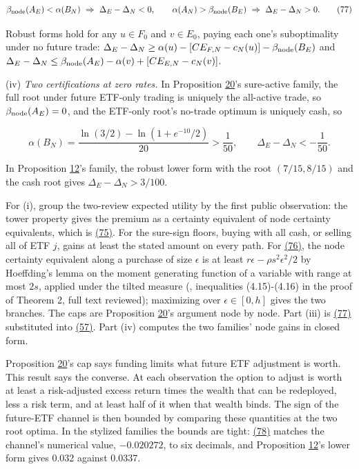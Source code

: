\documentclass[11pt]{article}
\begin{document}
\begin{equation*}
\beta_{\rm node}(A_E)<\alpha(B_N)\ \Rightarrow\ \Delta_E-\Delta_N<0,
\qquad
\alpha(A_N)>\beta_{\rm node}(B_E)\ \Rightarrow\ \Delta_E-\Delta_N>0.\tag{77}\label{eq:77}
\end{equation*}

Robust forms hold for any \(u\in F_0\) and \(v\in E_0\), paying each
one's suboptimality under no future trade:
\(\Delta_E-\Delta_N\geq\alpha(u)-[CE_{F,N}-c_N(u)]-\beta_{\rm node}(B_E)\)
and
\(\Delta_E-\Delta_N\leq\beta_{\rm node}(A_E)-\alpha(v)+[CE_{E,N}-c_N(v)]\).

(iv) \emph{Two certifications at zero rates.} In Proposition \hyperref[res:Proposition-20]{20}'s
sure-active family, the full root under future ETF-only trading is
uniquely the all-active trade, so \(\beta_{\rm node}(A_E)=0\), and the
ETF-only root's no-trade optimum is uniquely cash, so

\begin{equation*}
\alpha(B_N)=\frac{\ln(3/2)-\ln(1+e^{-10}/2)}{20}>\frac1{50},
\qquad \Delta_E-\Delta_N<-\frac1{50}.\tag{78}\label{eq:78}
\end{equation*}

In Proposition \hyperref[res:Proposition-12]{12}'s family, the robust lower form with the root
\((7/15,8/15)\) and the cash root gives \(\Delta_E-\Delta_N>3/100\).

For (i), group the two-review expected utility by the first public
observation: the tower property gives the premium as a certainty
equivalent of node certainty equivalents, which is \hyperref[eq:75]{(75)}. For the sure-sign floors, buying
with all cash, or selling all of ETF \(j\), gains at least the stated
amount on every path. For \hyperref[eq:76]{(76)}, the node certainty equivalent along a
purchase of size \(\epsilon\) is at least
\(r\epsilon-\rho s^2\epsilon^2/2\) by Hoeffding's lemma on the moment
generating function of a variable with range at most \(2s\), applied
under the tilted measure (\cite{hoeffding1963probability}, inequalities
(4.15)-(4.16) in the proof of Theorem 2, full text reviewed);
maximizing over \(\epsilon\in[0,h]\) gives the two branches. The
caps are Proposition \hyperref[res:Proposition-20]{20}'s argument node by node. Part (iii) is \hyperref[eq:77]{(77)}
substituted into \hyperref[eq:57]{(57)}. Part (iv) computes the two families' node
gains in closed form.

Proposition \hyperref[res:Proposition-20]{20}'s cap says funding limits what future ETF adjustment
is worth. This result says the converse. At each observation the
option to adjust is worth at least a risk-adjusted excess return
times the wealth that can be redeployed, less a risk term, and at
least half of it when that wealth binds. The sign of the future-ETF
channel is then bounded by comparing these quantities at the two
root optima. In the stylized families the bounds are tight: \hyperref[eq:78]{(78)}
matches the channel's numerical value, \(-0.020272\), to six
decimals, and Proposition \hyperref[res:Proposition-12]{12}'s lower form gives 0.032 against 0.0337.
\end{document}

